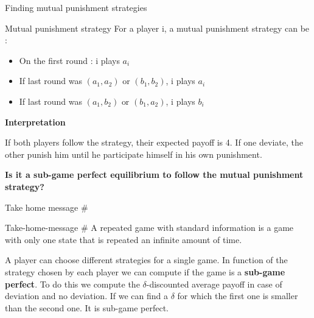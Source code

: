 \begin{frame}{Finding mutual punishment strategies}
    \begin{block}{Mutual punishment strategy}
        For a player i, a {\color{green}mutual punishment strategy} can be :
        \begin{itemize}
        	\item On the first round : i plays $a_i$ \pause
        	\item If last round was $(a_1,a_2) \text{ or } (b_1,b_2)$, i plays $a_i$ \pause
        	\item If last round was $(a_1,b_2) \text{ or } (b_1,a_2)$, i plays $b_i$
        \end{itemize}
    \end{block}
    \textbf{\color{green}Interpretation}
    
    If both players follow the strategy, their expected payoff is 4. If one deviate, the other punish him until he participate himself in his own punishment.
    
    \textbf{\color{green}Is it a sub-game perfect equilibrium to follow the mutual punishment strategy?}
    
\end{frame}

\begin{frame}{Take home message \#}
    \begin{block}{Take-home-message \#}
        A {\color{green}repeated game with standard information} is a game with only one state that is repeated an infinite amount of time.
        
        A player can choose different strategies for a single game. In function of the strategy chosen by each player we can compute if the game is a \textbf{sub-game perfect}. To do this we compute the $\delta$-discounted average payoff in case of deviation and no deviation. If we can find a $\delta$ for which the first one is smaller than the second one. It is sub-game perfect.
        
        
    \end{block}

\end{frame}